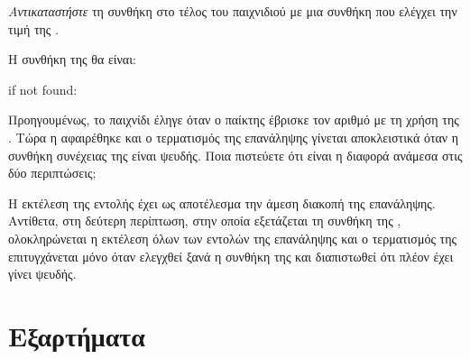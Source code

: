 \documentclass[a4paper,11pt,oneside]{book}
\begin{document}
\begin{step}
\emph{Αντικαταστήστε} τη συνθήκη  στο τέλος του παιχνιδιού με μια συνθήκη που ελέγχει την τιμή της .

\begin{answer}
Η συνθήκη της  θα είναι:

\begin{pynew}
if not found:
\end{pynew}
\end{answer}
\end{step}

\begin{step}
Προηγουμένως, το παιχνίδι έληγε όταν ο παίκτης έβρισκε τον αριθμό με τη χρήση της . Τώρα η  αφαιρέθηκε και ο τερματισμός της επανάληψης γίνεται αποκλειστικά όταν η συνθήκη συνέχειας της  είναι ψευδής. Ποια πιστεύετε ότι είναι η διαφορά ανάμεσα στις δύο περιπτώσεις;

\begin{answer}
Η εκτέλεση της εντολής  έχει ως αποτέλεσμα την άμεση διακοπή της επανάληψης. Αντίθετα, στη δεύτερη περίπτωση, στην οποία εξετάζεται τη συνθήκη της , ολοκληρώνεται η εκτέλεση όλων των εντολών της επανάληψης και ο τερματισμός της επιτυγχάνεται μόνο όταν ελεγχθεί ξανά η συνθήκη της  και διαπιστωθεί ότι πλέον έχει γίνει ψευδής.
\end{answer}
\end{step}

\section{Εξαρτήματα}
\end{document}

